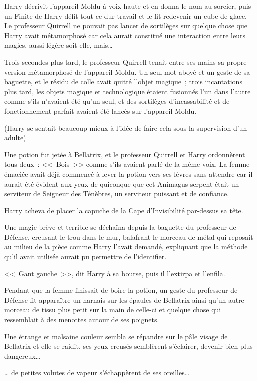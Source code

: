 Harry décrivit l'appareil Moldu à voix haute et en donna le nom au sorcier, puis un Finite de Harry défit tout ce dur travail et le fit redevenir un cube de glace. Le professeur Quirrell ne pouvait pas lancer de sortilèges sur quelque chose que Harry avait métamorphosé car cela aurait constitué une interaction entre leurs magies, aussi légère soit-elle, mais…

Trois secondes plus tard, le professeur Quirrell tenait entre ses mains sa propre version métamorphosé de l'appareil Moldu. Un seul mot aboyé et un geste de sa baguette, et le résidu de colle avait quitté l'objet magique~; trois incantations plus tard, les objets magique et technologique étaient fusionnés l'un dans l'autre comme s'ils n'avaient été qu'un seul, et des sortilèges d'incassabilité et de fonctionnement parfait avaient été lancés sur l'appareil Moldu.

(Harry se sentait beaucoup mieux à l'idée de faire cela sous la supervision d'un adulte)

Une potion fut jetée à Bellatrix, et le professeur Quirrell et Harry ordonnèrent tous deux~: <<~Bois~>> comme s'ils avaient parlé de la même voix. La femme émaciée avait déjà commencé à lever la potion vers ses lèvres sans attendre car il aurait été évident aux yeux de quiconque que cet Animagus serpent était un serviteur de Seigneur des Ténèbres, un serviteur puissant et de confiance.

Harry acheva de placer la capuche de la Cape d'Invisibilité par-dessus sa tête.

Une magie brève et terrible se déchaîna depuis la baguette du professeur de Défense, creusant le trou dans le mur, balafrant le morceau de métal qui reposait au milieu de la pièce comme Harry l'avait demandé, expliquant que la méthode qu'il avait utilisée aurait pu permettre de l'identifier.

<<~Gant gauche~>>, dit Harry à sa bourse, puis il l'extirpa et l'enfila.

Pendant que la femme finissait de boire la potion, un geste du professeur de Défense fit apparaître un harnais sur les épaules de Bellatrix ainsi qu'un autre morceau de tissu plus petit sur la main de celle-ci et quelque chose qui ressemblait à des menottes autour de ses poignets.

Une étrange et malsaine couleur sembla se répandre sur le pâle visage de Bellatrix et elle se raidit, ses yeux creusés semblèrent s'éclairer, devenir bien plus dangereux…

… de petites volutes de vapeur s'échappèrent de ses oreilles…

